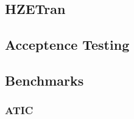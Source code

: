 \subsection{HZETran}

\subsection{Acceptence Testing}
\subsection{Benchmarks}
\subsubsection{ATIC}



